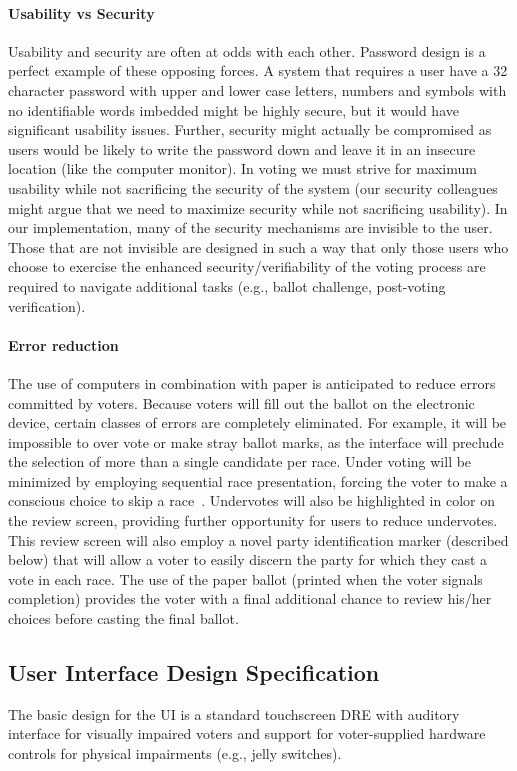 \paragraph{Usability vs Security}
Usability and security are often at odds with each other. Password design is a perfect example of these opposing forces. A system that requires a user have a 32 character password with upper and lower case letters, numbers and symbols with no identifiable words imbedded might be highly secure, but it would have significant usability issues. Further, security might actually be compromised as users would be likely to write the password down and leave it in an insecure location (like the computer monitor). In voting we must strive for maximum usability while not sacrificing the security of the system (our security colleagues might argue that we need to maximize security while not sacrificing usability). In our implementation, many of the security mechanisms are invisible to the user. Those that are not invisible are designed in such a way that only those users who choose to exercise the enhanced security/verifiability of the voting process are required to navigate additional tasks (e.g., ballot challenge, post-voting verification). 
\paragraph{Error reduction}
The use of computers in combination with paper is anticipated to reduce errors committed by voters. Because voters will fill out the ballot on the electronic device, certain classes of errors are completely eliminated. For example, it will be impossible to over vote or make stray ballot marks, as the interface will preclude the selection of more than a single candidate per race. Under voting will be minimized by employing sequential race presentation, forcing the voter to make a conscious choice to skip a race~\cite{greene-thesis}. Undervotes will also be highlighted in color on the review screen, providing further opportunity for users to reduce undervotes. This review screen will also employ a novel party identification marker (described below) that will allow a voter to easily discern the party for which they cast a vote in each race. The use of the paper ballot (printed when the voter signals completion) provides the voter with a final additional chance to review his/her choices before casting the final ballot. 

\subsection{User Interface Design Specification}
The basic design for the UI is a standard touchscreen DRE with auditory interface for visually impaired voters and support for voter-supplied hardware controls for physical impairments (e.g., jelly switches).
